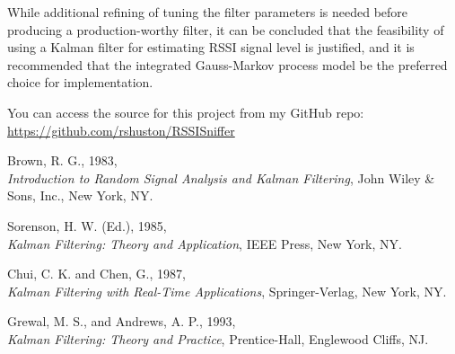 \documentclass[12pt]{article}
\begin{document}
\clearpage

While additional refining of tuning the filter parameters is needed before producing a
production-worthy filter, it can be concluded that the feasibility of using a Kalman
filter for estimating RSSI signal level is justified, and it is recommended that the
integrated Gauss-Markov process model be the preferred choice for implementation.

You can access the source for this project from my GitHub repo: \\
\textcolor{blue}{\url{https://github.com/rshuston/RSSISniffer}}



%
%

\clearpage

\begin{thebibliography}{9}

Brown, R. G., 1983, \\
\emph{Introduction to Random Signal Analysis and Kalman Filtering},
John Wiley \& Sons, Inc., New York, NY.

Sorenson, H. W. (Ed.), 1985, \\
\emph{Kalman Filtering: Theory and Application},
IEEE Press, New York, NY.

Chui, C. K. and Chen, G., 1987, \\
\emph{Kalman Filtering with Real-Time Applications},
Springer-Verlag, New York, NY.

Grewal, M. S., and Andrews, A. P., 1993, \\
\emph{Kalman Filtering: Theory and Practice},
Prentice-Hall, Englewood Cliffs, NJ.

\end{thebibliography}
\end{document}
